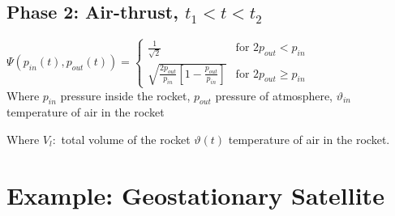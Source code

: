 \documentclass[10pt,a4paper]{scrartcl}
\begin{document}
\begin{multicols*}{3}



\vfill
\null
\columnbreak

\subsection{Phase 2: Air-thrust, $t_1<t<t_2$}






$\Psi(p_{in}(t),p_{out}(t))=\begin{cases}\frac{1}{\sqrt{2}}&\text{for }2p_{out}<p_{in}\\\sqrt{\frac{2p_{out}}{p_{in}}\left[1-\frac{p_{out}}{p_{in}}\right]}&\text{for }2p_{out}\geq p_{in}\end{cases}$ \\
Where $p_{in}$ pressure inside the rocket, $p_{out}$ pressure of atmosphere, $\vartheta_{in}$ temperature of air in the rocket


Where $V_l:$ total volume of the rocket $\vartheta(t)$ temperature of air in the rocket.


\vfill
\null
\newpage

\section{Example: Geostationary Satellite}


\end{multicols*}
\end{document}
